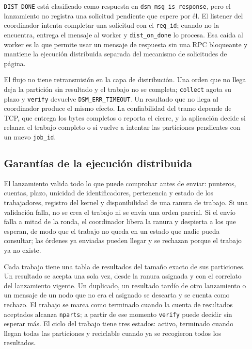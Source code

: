 \texttt{DIST\_DONE} está clasificado como respuesta en \texttt{dsm\_msg\_is\_response}, pero el lanzamiento no registra una solicitud pendiente que espere por él. El listener del coordinador intenta completar una solicitud con el \texttt{req\_id}; cuando no la encuentra, entrega el mensaje al worker y \texttt{dist\_on\_done} lo procesa. Esa caída al worker es la que permite usar un mensaje de respuesta sin una RPC bloqueante y mantiene la ejecución distribuida separada del mecanismo de solicitudes de página.

El flujo no tiene retransmisión en la capa de distribución. Una orden que no llega deja la partición sin resultado y el trabajo no se completa; \texttt{collect} agota su plazo y \texttt{verify} devuelve \texttt{DSM\_ERR\_TIMEOUT}. Un resultado que no llega al coordinador produce el mismo efecto. La confiabilidad del tramo depende de TCP, que entrega los bytes completos o reporta el cierre, y la aplicación decide si relanza el trabajo completo o si vuelve a intentar las particiones pendientes con un nuevo \texttt{job\_id}.

\subsection{Garantías de la ejecución distribuida}

El lanzamiento valida todo lo que puede comprobar antes de enviar: punteros, cuentas, plazo, unicidad de identificadores, pertenencia y estado de los trabajadores, registro del kernel y disponibilidad de una ranura de trabajo. Si una validación falla, no se crea el trabajo ni se envía una orden parcial. Si el envío falla a mitad de la ronda, el coordinador libera la ranura y despierta a los que esperan, de modo que el trabajo no queda en un estado que nadie pueda consultar; las órdenes ya enviadas pueden llegar y se rechazan porque el trabajo ya no existe.

Cada trabajo tiene una tabla de resultados del tamaño exacto de sus particiones. Un resultado se acepta una sola vez, desde la ranura asignada y con el correlato del lanzamiento vigente. Un duplicado, un resultado tardío de otro lanzamiento o un mensaje de un nodo que no era el asignado se descarta y se cuenta como rechazo. El trabajo se marca como terminado cuando la cuenta de resultados aceptados alcanza \texttt{nparts}; a partir de ese momento \texttt{verify} puede decidir sin esperar más. El ciclo del trabajo tiene tres estados: activo, terminado cuando llegan todas las particiones y reciclable cuando ya se recogieron todos los resultados.

